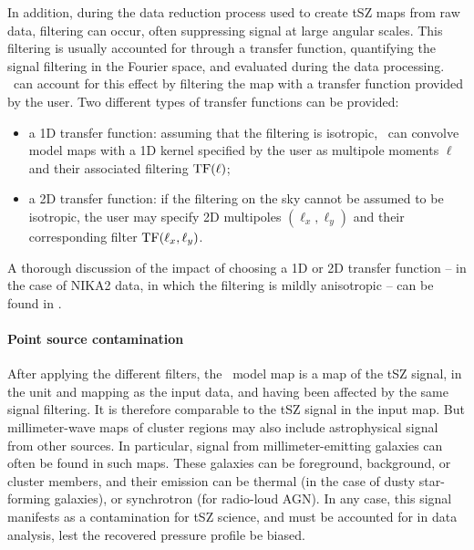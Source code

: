 In addition, during the data reduction process used to create tSZ maps from raw data, filtering can occur, often suppressing signal at large angular scales.
This filtering is usually accounted for through a transfer function, quantifying the signal filtering in the Fourier space, and evaluated during the data processing.
\panco\ can account for this effect by filtering the map with a transfer function provided by the user.
Two different types of transfer functions can be provided:
\begin{itemize}[leftmargin=*]
    \item a 1D transfer function: assuming that the filtering is isotropic, \panco\ can convolve model maps with a 1D kernel specified by the user as multipole moments $\ell$ and their associated filtering ${\rm TF}(\ell)$;
    \item a 2D transfer function: if the filtering on the sky cannot be assumed to be isotropic, the user may specify 2D multipoles $(\ell_x, \ell_y)$ and their corresponding filter ${\rm TF}(\ell_x, \ell_y)$.
\end{itemize}
A thorough discussion of the impact of choosing a 1D or 2D transfer function -- in the case of NIKA2 data, in which the filtering is mildly anisotropic -- can be found in \citet{munoz-echeverria_multi-probe_2022}.

\paragraph{Point source contamination}

After applying the different filters, the \panco\ model map is a map of the tSZ signal, in the unit and mapping as the input data, and having been affected by the same signal filtering.
It is therefore comparable to the tSZ signal in the input map.
But millimeter-wave maps of cluster regions may also include astrophysical signal from other sources.
In particular, signal from millimeter-emitting galaxies can often be found in such maps.
These galaxies can be foreground, background, or cluster members, and their emission can be thermal (in the case of dusty star-forming galaxies), or synchrotron (for radio-loud AGN).
In any case, this signal manifests as a contamination for tSZ science, and must be accounted for in data analysis, lest the recovered pressure profile be biased.

